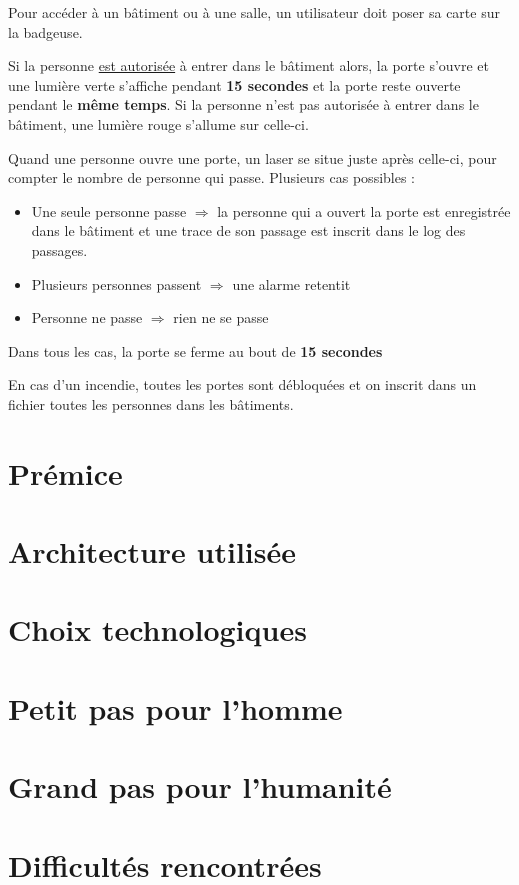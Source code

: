 \documentclass[a4paper,10pt]{article}
\begin{document}
        Pour accéder à un bâtiment ou à une salle, un utilisateur doit poser sa carte sur la badgeuse.
        \newline
        \par Si la personne \underline{est autorisée} à entrer dans le bâtiment alors, la porte s'ouvre et une lumière verte s'affiche pendant \textbf{15 secondes} et la porte reste ouverte pendant le \textbf{même temps}.
        \newline
        Si la personne n'est pas autorisée à entrer dans le bâtiment, une lumière rouge s'allume sur celle-ci.
        \newline
        \par
        Quand une personne ouvre une porte, un laser se situe juste après celle-ci, pour compter le nombre de personne qui passe. Plusieurs cas possibles :
        \begin{itemize}
            \item Une seule personne passe $\Rightarrow$ la personne qui a ouvert la porte est enregistrée dans le bâtiment et une trace de son passage est inscrit dans le log des passages.
            \item Plusieurs personnes passent $\Rightarrow$ une alarme retentit
            \item Personne ne passe $\Rightarrow$ rien ne se passe
        \end{itemize}

        Dans tous les cas, la porte se ferme au bout de \textbf{15 secondes}
        \newline

        \par En cas d'un incendie, toutes les portes sont débloquées et on inscrit dans un fichier toutes les personnes dans les bâtiments.
        \pagebreak
    \section{Prémice}
    \pagebreak
    \section{Architecture utilisée}
    \pagebreak
    \section{Choix technologiques}
    \pagebreak
    \section{Petit pas pour l'homme}
    \pagebreak
    \section{Grand pas pour l'humanité}
    \pagebreak
    \section{Difficultés rencontrées}
    \pagebreak
    
\end{document}
